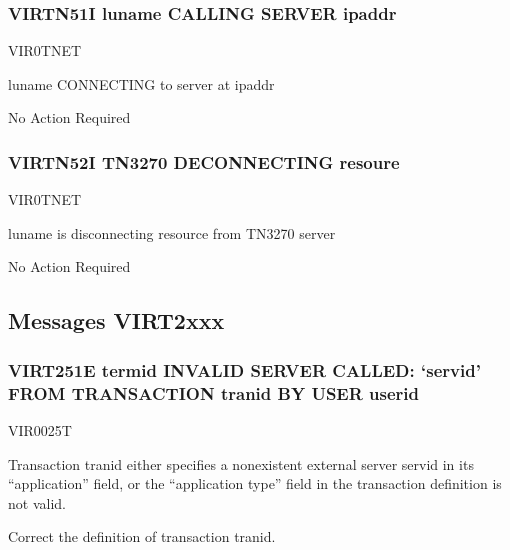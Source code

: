 \documentclass[letterpaper,10pt,english]{sphinxmanual}
\begin{document}
\subsubsection{VIRTN51I  luname CALLING SERVER ipaddr}
\label{\detokenize{messages:virtn51i-luname-calling-server-ipaddr}}\begin{description}
\sphinxAtStartPar
VIR0TNET

\sphinxAtStartPar
luname CONNECTING to server at ipaddr

\sphinxAtStartPar
No Action Required

\end{description}


\subsubsection{VIRTN52I TN3270 DECONNECTING resoure}
\label{\detokenize{messages:virtn52i-tn3270-deconnecting-resoure}}\begin{description}
\sphinxAtStartPar
VIR0TNET

\sphinxAtStartPar
luname is disconnecting resource from TN3270 server

\sphinxAtStartPar
No Action Required

\end{description}


\subsection{Messages VIRT2xxx}
\label{\detokenize{messages:messages-virt2xxx}}

\subsubsection{VIRT251E termid INVALID SERVER CALLED: ‘servid’ FROM TRANSACTION tranid BY USER userid}
\label{\detokenize{messages:virt251e-termid-invalid-server-called-servid-from-transaction-tranid-by-user-userid}}\begin{description}
\sphinxAtStartPar
VIR0025T

\sphinxAtStartPar
Transaction tranid either specifies a non\sphinxhyphen{}existent external server servid in its “application” field, or the “application type” field in the transaction definition is not valid.

\sphinxAtStartPar
Correct the definition of transaction tranid.

\end{description}
\end{document}
